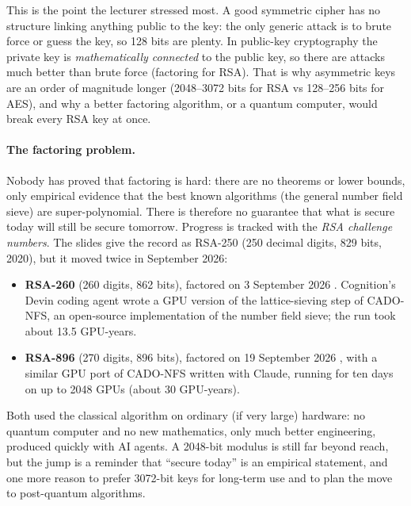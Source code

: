 \begin{remark}
This is the point the lecturer stressed most. A good symmetric cipher has no structure linking anything public to the key: the only generic attack is to brute force or guess the key, so 128 bits are plenty. In public-key cryptography the private key is \emph{mathematically connected} to the public key, so there are attacks much better than brute force (factoring for RSA). That is why asymmetric keys are an order of magnitude longer (2048--3072 bits for RSA vs 128--256 bits for AES), and why a better factoring algorithm, or a quantum computer, would break every RSA key at once.
\end{remark}

\paragraph{The factoring problem.} Nobody has proved that factoring is hard: there are no theorems or lower bounds, only empirical evidence that the best known algorithms (the general number field sieve) are super-polynomial. There is therefore no guarantee that what is secure today will still be secure tomorrow. Progress is tracked with the \emph{RSA challenge numbers}. The slides give the record as RSA-250 (250 decimal digits, 829 bits, 2020), but it moved twice in September 2026:
\begin{itemize}
    \item \textbf{RSA-260} (260 digits, 862 bits), factored on 3 September 2026 \cite{lu2026rsa260}. Cognition's Devin coding agent wrote a GPU version of the lattice-sieving step of CADO-NFS, an open-source implementation of the number field sieve; the run took about 13.5 GPU-years.
    \item \textbf{RSA-896} (270 digits, 896 bits), factored on 19 September 2026 \cite{weis2026rsa896}, with a similar GPU port of CADO-NFS written with Claude, running for ten days on up to 2048 GPUs (about 30 GPU-years).
\end{itemize}
Both used the classical algorithm on ordinary (if very large) hardware: no quantum computer and no new mathematics, only much better engineering, produced quickly with AI agents. A 2048-bit modulus is still far beyond reach, but the jump is a reminder that \enquote{secure today} is an empirical statement, and one more reason to prefer 3072-bit keys for long-term use and to plan the move to post-quantum algorithms.

